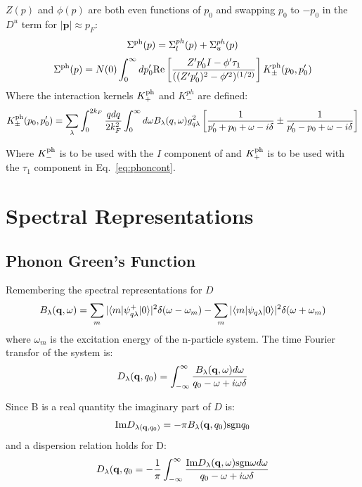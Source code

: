 $Z(p)$ and $\phi(p)$ are both even functions of $p_{0}$ and swapping $p_0$ to $-p_0$
in the $D^{u}$ term for $|\mathbf{p}|\approx p_{F}$: 
%
\begin{equation}
\Sigma^{\rm ph}(p) =  \Sigma_{l}^{ph}(p) + \Sigma_{u}^{ph}(p)
\end{equation}
%
\begin{equation}
\label{eq:phoncont}
\Sigma^{\rm ph}(p) =  N(0) \int_{0}^{\infty} dp'_{0}{\rm Re}\left[\frac{Z'p_{0}' I - \phi'\tau_{1}}{((Z'p'_{0})^{2}-\phi'^{2})^{(1/2)}}\right]
K_{\pm}^{\rm ph}(p_{0}, p_{0}') 
\end{equation}
% 
Where the interaction kernels $K_{+}^{\rm ph}$ and $K^{ph}_{-}$ are defined:
%
\begin{equation}
K_{\pm}^{\rm ph}(p_{0},p_{0}') = \sum_{\lambda} \int_{0}^{2k_{F}}\frac{qdq}{2k_{F}^{2}}
\int_{0}^{\infty}d\omega B_{\lambda}(q,\omega) g^{2}_{q\lambda} 
\left[ \frac{1}{p_{0}'+p_{0} + \omega - i\delta } \pm \frac{1}{p'_{0} -p_{0} + \omega - i\delta} \right]
\end{equation}

Where $K_{-}^{\rm ph}$ is to be used with the $I$ component of and $K_{+}^{\rm ph}$ is to be used with the $\tau_{1}$
component in Eq.~\ref{eq:phoncont}.

\section{Spectral Representations}
\subsection{Phonon Green's Function}
Remembering the spectral representations for $D$
%
\begin{equation}
B_{\lambda}({\bf q},\omega) = \sum_{m} |\langle m| \psi^{+}_{q\lambda}|0\rangle|^{2}\delta(\omega-\omega_{m})
- \sum_{m}|\langle m | \psi_{q\lambda} | 0 \rangle | ^{2} \delta(\omega+\omega_{m})
\end{equation}
% 
where $\omega_{m}$ is the excitation energy of the n-particle system.
The time Fourier transfor of the system is:
%
\begin{equation}
D_{\lambda} ({\bf q}, q_{0}) = \int_{-\infty}^{\infty} \frac{B_{\lambda}({\bf q},\omega) d\omega}{q_{0}-\omega + i\omega\delta}
\end{equation}
%

Since B is a real quantity the imaginary part of $D$ is:
%
\begin{equation}
{\rm Im} D_{\lambda({\bf q},q_{0})} = - \pi B_{\lambda}({\bf q},q_{0}){\rm sgn} q_{0}
\end{equation}
%
and a dispersion relation holds for D:
%
\begin{equation}
D_{\lambda}({\bf q},q_{0} = -\frac{1}{\pi} \int_{-\infty}^{\infty} \frac{{\rm Im} D_{\lambda}({\bf q},\omega) {\rm sgn \omega} d\omega}{q_{0} - \omega + i\omega\delta}
\end{equation}


